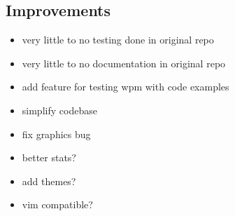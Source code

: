 \documentclass{article}
\begin{document}
\subsection*{Improvements}
\begin{itemize}
    \item very little to no testing done in original repo
    \item very little to no documentation in original repo
    \item add feature for testing wpm with code examples
    \item simplify codebase
    \item fix graphics bug
    \item better stats?
    \item add themes?
    \item vim compatible?
\end{itemize}
\end{document}
